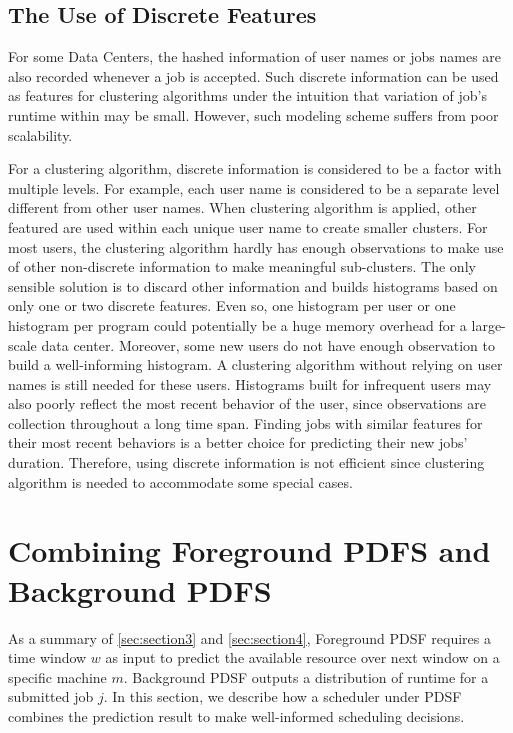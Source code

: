 \documentclass[sigplan,10pt,review,anonymous]{acmart}
\begin{document}
\subsection{The Use of Discrete Features}
\label{sec:section4.2}

For some Data Centers, the hashed information of user names or jobs names are also recorded whenever a job is accepted. Such discrete information can be used as features for clustering algorithms under the intuition that variation of job's runtime within may be small. However, such modeling scheme suffers from poor scalability. 

For a clustering algorithm, discrete information is considered to be a factor with multiple levels. For example, each user name is considered to be a separate level different from other user names. When clustering algorithm is applied, other featured are used within each unique user name to create smaller clusters. For most users, the clustering algorithm hardly has enough observations to make use of other non-discrete information to make meaningful sub-clusters. The only sensible solution is to discard other information and builds histograms based on only one or two discrete features. Even so, one histogram per user or one histogram per program could potentially be a huge memory overhead for a large-scale data center. Moreover, some new users do not have enough observation to build a well-informing histogram. A clustering algorithm without relying on user names is still needed for these users. Histograms built for infrequent users may also poorly reflect the most recent behavior of the user, since observations are collection throughout a long time span. Finding jobs with similar features for their most recent behaviors is a better choice for predicting their new jobs' duration. Therefore, using discrete information is not efficient since clustering algorithm is needed to accommodate some special cases. 

\section{Combining Foreground PDFS and Background PDFS}
\label{sec:section5}

As a summary of \cref{sec:section3} and \cref{sec:section4}, Foreground PDSF requires a time window $w$ as input to predict the available resource over next window on a specific machine $m$. Background PDSF outputs a distribution of runtime for a submitted job $j$. In this section, we describe how a scheduler under PDSF combines the prediction result to make well-informed scheduling decisions.
\end{document}
